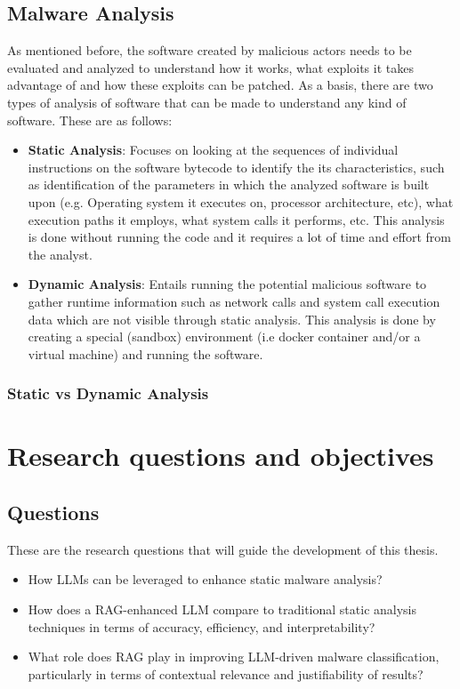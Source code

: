\subsection{Malware Analysis}
As mentioned before, the software created by malicious actors needs to be evaluated and analyzed to
understand how it works, what exploits it takes advantage of and how these exploits can be patched.
As a basis, there are two types of analysis of software that can be made to understand any kind of
software. These are as follows:
\begin{itemize}
	\item \textbf{Static Analysis}: Focuses on looking at the sequences of individual instructions on the software
	      bytecode to identify the its characteristics, such as identification of the parameters in which the
	      analyzed software is built upon (e.g. Operating system it executes on, processor architecture,
	      etc), what execution paths it employs, what system calls it performs, etc. This analysis is done
	      without running the code and it requires a lot of time and effort from the analyst.
	\item \textbf{Dynamic Analysis}: Entails running the potential malicious software to gather runtime information such as network calls
	      and system call execution data which are not visible through static analysis. This analysis is done by creating a special (sandbox) environment (i.e docker container and/or a virtual machine) and running the software.
\end{itemize}

\subsubsection{Static vs Dynamic Analysis}


\section{Research questions and objectives}

\subsection{Questions}
These are the research questions that will guide the development of this thesis.
\begin{itemize}
	\item How LLMs can be leveraged to enhance static malware analysis?
	\item How does a RAG-enhanced LLM compare to traditional static analysis techniques in terms of accuracy,
	      efficiency, and interpretability?
	\item What role does RAG play in improving LLM-driven malware classification, particularly in terms of
	      contextual relevance and justifiability of results?
\end{itemize}

